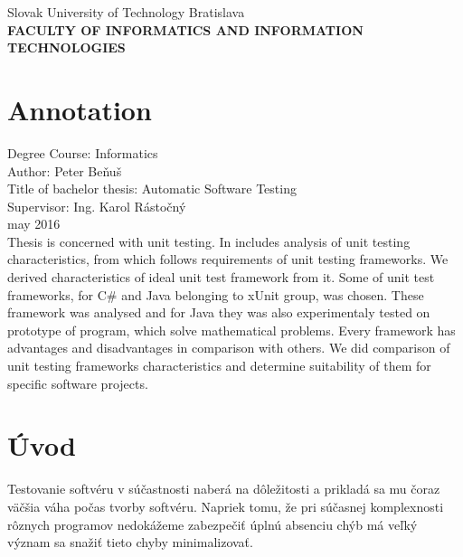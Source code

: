 \documentclass[11pt,twoside,slovak,a4paper]{article}
\begin{document}
	\begin{titlepage}
		\begin{center}
			\large 		Slovak University of Technology Bratislava\\
			\textbf{\MakeUppercase{Faculty of Informatics and Information Technologies}}\\
			\hrulefill
		\end{center}
		\section*{Annotation}
		Degree Course: Informatics\\
		Author: Peter Beňuš \\
		Title of bachelor thesis: Automatic Software Testing\\
		Supervisor: Ing. Karol Rástočný \\
		may 2016 \\
		Thesis is concerned with unit testing. In includes analysis of unit testing characteristics, from which follows requirements of unit testing frameworks. We derived characteristics of ideal unit test framework from it. Some of unit test frameworks, for C\# and Java belonging to xUnit group, was chosen. These framework was analysed and for Java they was also experimentaly tested on prototype of program, which solve mathematical problems. Every framework has advantages and disadvantages in comparison with others. We did comparison of unit testing frameworks characteristics and determine suitability of them for specific software projects.		
		
	\end{titlepage}
	
	\begin{titlepage}
		\tableofcontents
	\end{titlepage}
	
	
	\pagestyle{fancy}
	\fancyhf{}
	\fancyhead[RE,RO]{\thechapter \leftmark}
	\fancyfoot[CE,CO]{\thepage}
	\headheight 14pt
	\setcounter{page}{1}
	
	\thispagestyle{plain}
	\section{Úvod}
	Testovanie softvéru v súčastnosti naberá na dôležitosti a prikladá sa mu čoraz väčšia váha počas tvorby softvéru. Napriek tomu, že pri súčasnej komplexnosti rôznych programov nedokážeme zabezpečiť úplnú absenciu chýb má veľký význam sa snažiť tieto chyby minimalizovať.
	
\end{document}
